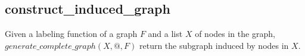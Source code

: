     
    \subsection*{construct\_induced\_graph}
    Given a labeling function of a graph $F$ and a list $X$ of nodes in the graph, $generate\_complete\_graph(X,@,F)$ return the subgraph induced by nodes in $X$.  
    

